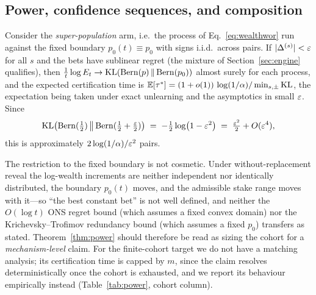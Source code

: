 \subsection{Power, confidence sequences, and composition}

\begin{theorem}\label{thm:power}
Consider the \emph{super-population} arm, i.e.\ the process of
Eq.~\eqref{eq:wealthwor} run against the fixed boundary $p_0(t) \equiv p_0$ with signs
i.i.d.\ across pairs. If $|\Delta^{(s)}| < \varepsilon$ for all $s$ and the bets have
sublinear regret (the mixture of Section~\ref{sec:engine} qualifies), then
$\tfrac1t \log E_t \to \mathrm{KL}(\mathrm{Bern}(p)\,\|\,\mathrm{Bern}(p_0))$ almost surely for each process,
and the expected certification time is
$\mathbb{E}[\tau^*] = (1+o(1))\,\log(1/\alpha)/\min_{s,\pm}\mathrm{KL}$, the expectation being
taken under exact unlearning and the asymptotics in small $\varepsilon$. Since
\begin{equation}\label{eq:klexp}
\mathrm{KL}\bigl(\mathrm{Bern}(\tfrac12)\,\big\|\,\mathrm{Bern}(\tfrac12 + \tfrac{\varepsilon}2)\bigr)
\;=\; -\tfrac12\log\bigl(1-\varepsilon^2\bigr)
\;=\; \tfrac{\varepsilon^2}{2} + O(\varepsilon^4),
\end{equation}
this is approximately $2\log(1/\alpha)/\varepsilon^2$ pairs.
\end{theorem}

The restriction to the fixed boundary is not cosmetic. Under without-replacement reveal the log-wealth increments are
neither independent nor identically distributed, the boundary $p_0(t)$ moves, and the
admissible stake range moves with it---so ``the best constant bet'' is not well
defined, and neither the $O(\log t)$ ONS regret bound (which assumes a fixed convex
domain) nor the Krichevsky--Trofimov redundancy bound (which assumes a fixed $p_0$)
transfers as stated. Theorem~\ref{thm:power} should therefore be read as sizing the
cohort for a \emph{mechanism-level} claim. For the finite-cohort target we do not have
a matching analysis; its certification time is capped by $m$, since the claim resolves
deterministically once the cohort is exhausted, and we report its behaviour
empirically instead (Table~\ref{tab:power}, cohort column).

